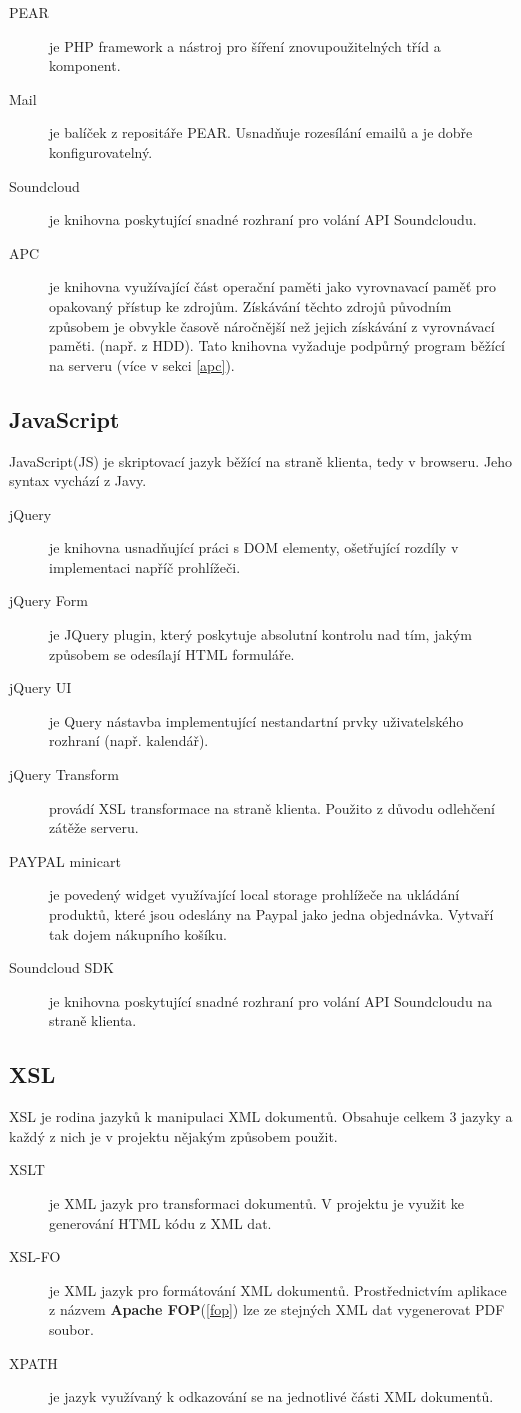 \documentclass[12pt]{article}
\begin{document}
\begin{description}
\item[PEAR] je PHP framework a nástroj pro šíření znovupoužitelných tříd a komponent.
\item[Mail] je balíček z repositáře PEAR. Usnadňuje rozesílání emailů a je dobře konfigurovatelný.
\item[Soundcloud] je knihovna poskytující snadné rozhraní pro volání API Soundcloudu.
\item[APC] je knihovna využívající část operační paměti jako vyrovnavací paměť pro opakovaný přístup ke zdrojům. Získávání těchto zdrojů původním způsobem je obvykle časově náročnější než jejich získávání z vyrovnávací paměti. (např. z HDD). Tato knihovna vyžaduje podpůrný program běžící na serveru (více v sekci \ref{apc}).
\end{description}

\subsection{JavaScript}
JavaScript(JS) je skriptovací jazyk běžící na straně klienta, tedy v browseru. Jeho syntax vychází z Javy.

\begin{description}
\item[jQuery] je knihovna usnadňující práci s DOM elementy, ošetřující rozdíly v implementaci napříč prohlížeči.
\item[jQuery Form] je JQuery plugin, který poskytuje absolutní kontrolu nad tím, jakým způsobem se odesílají HTML formuláře.
\item[jQuery UI] je Query nástavba implementující nestandartní prvky uživatelského rozhraní (např. kalendář).
\item[jQuery Transform] provádí XSL transformace na straně klienta. Použito z důvodu odlehčení zátěže serveru.
\item[PAYPAL minicart] je povedený widget využívající local storage prohlížeče na ukládání produktů, které jsou odeslány na Paypal jako jedna objednávka. Vytvaří tak dojem nákupního košíku.
\item[Soundcloud SDK] je knihovna poskytující snadné rozhraní pro volání API Soundcloudu na straně klienta.
\end{description}

\subsection{XSL}
XSL\cite{w3cXSL} je rodina jazyků k manipulaci XML dokumentů. Obsahuje celkem 3 jazyky a každý z nich je v projektu nějakým způsobem použit.
\begin{description}
\item[XSLT] je XML jazyk pro transformaci dokumentů. V projektu je využit ke generování HTML kódu z XML dat.
\item[XSL-FO] je XML jazyk pro formátování XML dokumentů. Prostřednictvím aplikace z názvem \textbf{Apache FOP}(\ref{fop}) lze ze stejných XML dat vygenerovat PDF soubor.
\item[XPATH] je jazyk využívaný k odkazování se na jednotlivé části XML dokumentů.
\end{description}
\end{document}

